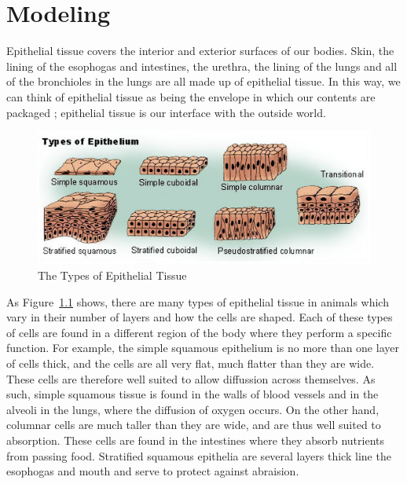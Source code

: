 \chapter{Modeling}
\label{chap:intro}
Epithelial tissue covers the interior and exterior surfaces of our bodies. Skin, the lining of the esophogas and intestines, the urethra, the lining of the lungs and all of the bronchioles in the lungs are all made up of epithelial tissue. In this way, we can think of epithelial tissue as being the envelope in which our contents are packaged \cite{Shape Formation}; epithelial tissue is our interface with the outside world. 

\begin{figure}[hb]
\centering \includegraphics[width=\textwidth]{../diagrams/output.png}
\caption{The Types of Epithelial Tissue}
\label{fig:types}
\end{figure}

As Figure~\ref{fig:types} shows, there are many types of epithelial tissue in animals which vary in their number of layers and how the cells are shaped. Each of these types of cells are found in a different region of the body where they perform a specific function.  For example, the simple squamous epithelium is no more than one layer of cells thick, and the cells are all very flat, much flatter than they are wide. These cells are therefore well suited to  allow diffussion across themselves. As such, simple squamous tissue is found in the walls of blood vessels and in the alveoli in the lungs, where the diffusion of oxygen occurs. On the other hand, columnar cells are much taller than they are wide, and are thus well suited to absorption. These cells are found in the intestines where they absorb nutrients from passing food. Stratified squamous epithelia are several layers thick line the esophogas and mouth and serve to protect against abraision.

